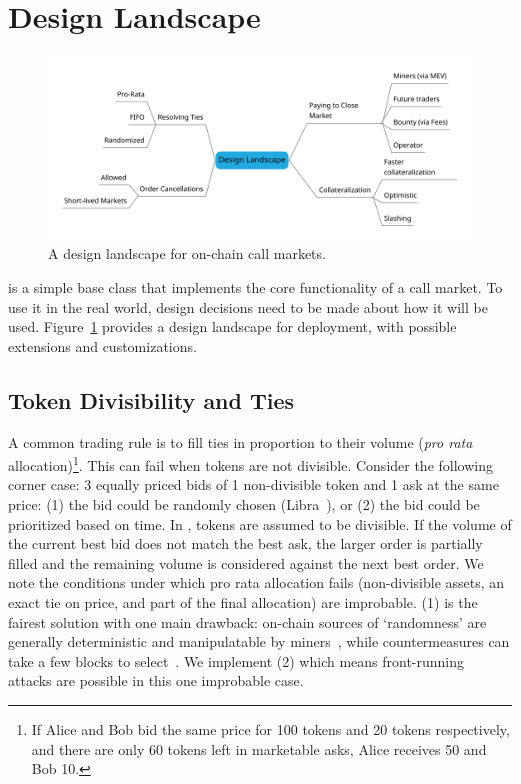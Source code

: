 \section{Design Landscape}

\begin{figure}[t]
\centering
\includegraphics[width=1\textwidth]{fig/MindMapDraft5.pdf}
\caption{\footnotesize{A design landscape for on-chain call markets.}  \label{fig:rmindmap}}
\end{figure}

\cm is a simple base class that implements the core functionality of a call market. To use it in the real world, design decisions need to be made about how it will be used. Figure~\ref{fig:rmindmap} provides a design landscape for \cm deployment, with possible extensions and customizations.



\subsection{Token Divisibility and Ties}

A common trading rule is to fill ties in proportion to their volume (\ie \textit{pro rata} allocation)\footnote{If Alice and Bob bid the same price for 100 tokens and 20 tokens respectively, and there are only 60 tokens left in marketable asks, Alice receives 50 and Bob 10.}. This can fail when tokens are not divisible. Consider the following corner case: 3 equally priced bids of 1 non-divisible token and 1 ask at the same price: (1) the bid could be randomly chosen (\cf Libra~\cite{mavroudis2019libra}), or (2) the bid could be prioritized based on time. In \cm, tokens are assumed to be divisible. If the volume of the current best bid does not match the best ask, the larger order is partially filled and the remaining volume is considered against the next best order. We note the conditions under which pro rata allocation fails (\ie non-divisible assets, an exact tie on price, and part of the final allocation) are improbable. (1) is the fairest solution with one main drawback: on-chain sources of `randomness' are generally deterministic and manipulatable by miners~\cite{bonneau2015random,buenz2017proofs}, while countermeasures can take a few blocks to select~\cite{boneh2018verifiable}. We implement (2) which means front-running attacks are possible in this one improbable case. 

